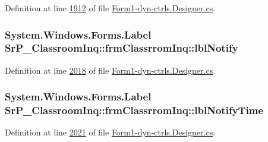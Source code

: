 \-Definition at line \hyperlink{_form1-dyn-ctrls_8_designer_8cs_source_l01912}{1912} of file \hyperlink{_form1-dyn-ctrls_8_designer_8cs_source}{\-Form1-\/dyn-\/ctrls.\-Designer.\-cs}.

\hypertarget{class_sr_p___classroom_inq_1_1frm_classrrom_inq_ae411ca1f1461cf7e863fcaba8789c493}{
\subsubsection[{lbl\-Notify}]{\setlength{\rightskip}{0pt plus 5cm}\-System.\-Windows.\-Forms.\-Label {\bf \-Sr\-P\-\_\-\-Classroom\-Inq\-::frm\-Classrrom\-Inq\-::lbl\-Notify}}}
\label{class_sr_p___classroom_inq_1_1frm_classrrom_inq_ae411ca1f1461cf7e863fcaba8789c493}


\-Definition at line \hyperlink{_form1-dyn-ctrls_8_designer_8cs_source_l02018}{2018} of file \hyperlink{_form1-dyn-ctrls_8_designer_8cs_source}{\-Form1-\/dyn-\/ctrls.\-Designer.\-cs}.

\hypertarget{class_sr_p___classroom_inq_1_1frm_classrrom_inq_a4097bd097ccf5dc695605b923b5dcc76}{
\subsubsection[{lbl\-Notify\-Time}]{\setlength{\rightskip}{0pt plus 5cm}\-System.\-Windows.\-Forms.\-Label {\bf \-Sr\-P\-\_\-\-Classroom\-Inq\-::frm\-Classrrom\-Inq\-::lbl\-Notify\-Time}}}
\label{class_sr_p___classroom_inq_1_1frm_classrrom_inq_a4097bd097ccf5dc695605b923b5dcc76}


\-Definition at line \hyperlink{_form1-dyn-ctrls_8_designer_8cs_source_l02021}{2021} of file \hyperlink{_form1-dyn-ctrls_8_designer_8cs_source}{\-Form1-\/dyn-\/ctrls.\-Designer.\-cs}.

